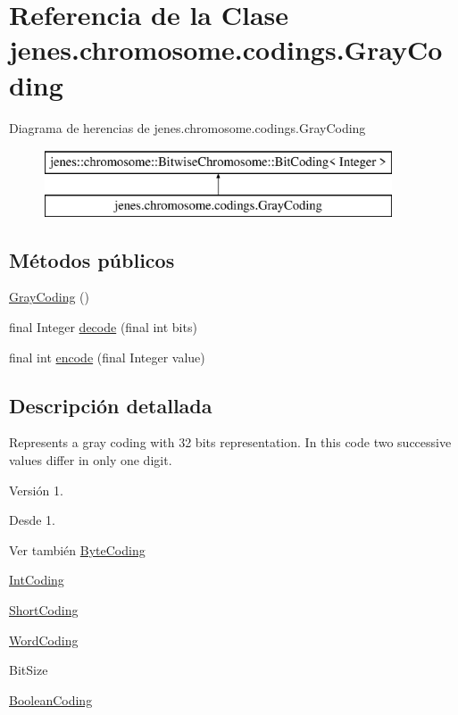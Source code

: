 \hypertarget{classjenes_1_1chromosome_1_1codings_1_1_gray_coding}{\section{Referencia de la Clase jenes.\-chromosome.\-codings.\-Gray\-Coding}
\label{classjenes_1_1chromosome_1_1codings_1_1_gray_coding}
}
Diagrama de herencias de jenes.\-chromosome.\-codings.\-Gray\-Coding\begin{figure}[H]
\begin{center}
\leavevmode
\includegraphics[height=2.000000cm]{classjenes_1_1chromosome_1_1codings_1_1_gray_coding}
\end{center}
\end{figure}
\subsection*{Métodos públicos}
\begin{DoxyCompactItemize}
\item 
\hyperlink{classjenes_1_1chromosome_1_1codings_1_1_gray_coding_a55dedef21f32baa6e10eec066fc549ba}{Gray\-Coding} ()
\item 
final Integer \hyperlink{classjenes_1_1chromosome_1_1codings_1_1_gray_coding_ab18b4f8ca1b0bed9242254405fde897e}{decode} (final int bits)
\item 
final int \hyperlink{classjenes_1_1chromosome_1_1codings_1_1_gray_coding_ab25d7513076e67bdd6aa15d9797673c0}{encode} (final Integer value)
\end{DoxyCompactItemize}


\subsection{Descripción detallada}
Represents a gray coding with 32 bits representation. In this code two successive values differ in only one digit.

\begin{DoxyVersion}{Versión}
1. 
\end{DoxyVersion}
\begin{DoxySince}{Desde}
1.
\end{DoxySince}
\begin{DoxySeeAlso}{Ver también}
\hyperlink{classjenes_1_1chromosome_1_1codings_1_1_byte_coding}{Byte\-Coding} 

\hyperlink{classjenes_1_1chromosome_1_1codings_1_1_int_coding}{Int\-Coding} 

\hyperlink{classjenes_1_1chromosome_1_1codings_1_1_short_coding}{Short\-Coding} 

\hyperlink{classjenes_1_1chromosome_1_1codings_1_1_word_coding}{Word\-Coding} 

Bit\-Size 

\hyperlink{classjenes_1_1chromosome_1_1codings_1_1_boolean_coding}{Boolean\-Coding} 
\end{DoxySeeAlso}



